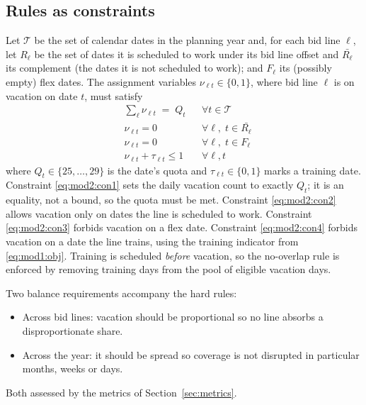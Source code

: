 \documentclass[preprint,12pt]{elsarticle}
\begin{document}
   \subsection{Rules as constraints}
   Let $\mathcal{T}$ be the set of calendar dates in the planning year and, for each bid line $\ell$, let $R_\ell$ be the set of dates it is scheduled to work under its bid line offset and $\bar{R_\ell}$ its complement (the dates it is not scheduled to work); and $F_\ell$ its (possibly empty) flex dates. The assignment variables $\nu_{\ell t}\in\{0,1\}$, where bid line $\ell$ is on vacation on date $t$, must satisfy
   \begin{align}
      & \sum\limits_{\ell} \nu_{\ell t} \;=\; Q_t && \forall t \in \mathcal{T} \label{eq:mod2:con1}\\
      & \nu_{\ell t} = 0 && \forall \ell,\; t \in \bar{R_\ell} \label{eq:mod2:con2}\\
      & \nu_{\ell t} = 0 && \forall \ell,\; t \in F_\ell \label{eq:mod2:con3}\\
      & \nu_{\ell t} + \tau_{\ell t} \le 1 && \forall \ell, t \label{eq:mod2:con4}
   \end{align}
   where $Q_t\in\{25,\dots,29\}$ is the date's quota and $\tau_{\ell t}\in\{0,1\}$ marks a training date. Constraint \eqref{eq:mod2:con1} sets the daily vacation count to exactly $Q_t$; it is an equality, not a bound, so the quota must be met. Constraint \eqref{eq:mod2:con2} allows vacation only on dates the line is scheduled to work. Constraint \eqref{eq:mod2:con3} forbids vacation on a flex date. Constraint \eqref{eq:mod2:con4} forbids vacation on a date the line trains, using the training indicator from \eqref{eq:mod1:obj}. Training is scheduled \emph{before} vacation, so the no-overlap rule is enforced by removing training days from the pool of eligible vacation days.

   Two balance requirements accompany the hard rules:
   \begin{itemize}
      \item Across bid lines: vacation should be proportional so no line absorbs a disproportionate share.
      \item Across the year: it should be spread so coverage is not disrupted in particular months, weeks or days.
   \end{itemize}
   Both assessed by the metrics of Section~\ref{sec:metrics}.
\end{document}

